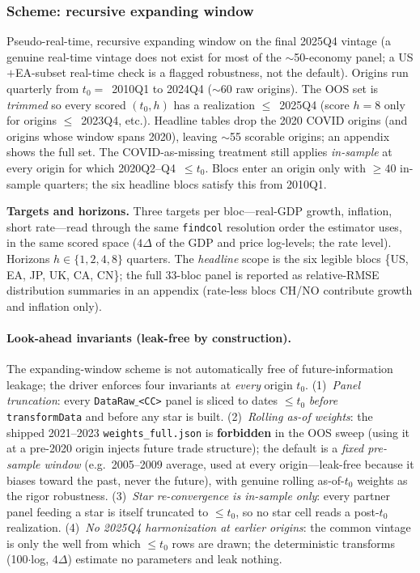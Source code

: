 \documentclass[11pt]{article}
\theoremstyle{definition}
\theoremstyle{remark}
\begin{document}
\subsubsection{Scheme: recursive expanding window}\label{sec:empirical:scheme}

Pseudo-real-time, recursive expanding window on the final 2025Q4 vintage
(a genuine real-time vintage does not exist for most of the $\sim$50-economy
panel; a US$+$EA-subset real-time check is a flagged robustness, not the
default). Origins run quarterly from $t_0=$~2010Q1 to 2024Q4
($\sim$60 raw origins). The OOS set is \emph{trimmed} so every scored
$(t_0,h)$ has a realization $\le$~2025Q4 (score $h{=}8$ only for origins
$\le$~2023Q4, etc.). Headline tables drop the 2020 COVID origins (and
origins whose window spans 2020), leaving $\sim$55 scorable origins;
an appendix shows the full set. The COVID-as-missing treatment still
applies \emph{in-sample} at every origin for which 2020Q2--Q4~$\le t_0$.
Blocs enter an origin only with $\ge40$ in-sample quarters; the six
headline blocs satisfy this from 2010Q1.

\textbf{Targets and horizons.} Three targets per bloc---real-GDP growth,
inflation, short rate---read through the same \texttt{findcol} resolution
order the estimator uses, in the same scored space ($4\Delta$ of the GDP
and price log-levels; the rate level). Horizons $h\in\{1,2,4,8\}$
quarters. The \emph{headline} scope is the six legible blocs
\{US, EA, JP, UK, CA, CN\}; the full 33-bloc panel is reported as
relative-RMSE distribution summaries in an appendix (rate-less blocs
CH/NO contribute growth and inflation only).

\paragraph{Look-ahead invariants (leak-free by construction).} The
expanding-window scheme is not automatically free of future-information
leakage; the driver enforces four invariants at \emph{every} origin
$t_0$. (1)~\emph{Panel truncation}: every \texttt{DataRaw}$\_$\texttt{<CC>}
panel is sliced to dates $\le t_0$ \emph{before} \texttt{transformData}
and before any star is built. (2)~\emph{Rolling as-of weights}: the
shipped 2021--2023 \texttt{weights\_full.json} is \textbf{forbidden} in
the OOS sweep (using it at a pre-2020 origin injects future trade
structure); the default is a \emph{fixed pre-sample window}
(e.g.\ 2005--2009 average, used at every origin---leak-free because it
biases toward the past, never the future), with genuine rolling
as-of-$t_0$ weights as the rigor robustness. (3)~\emph{Star re-convergence
is in-sample only}: every partner panel feeding a star is itself
truncated to $\le t_0$, so no star cell reads a post-$t_0$ realization.
(4)~\emph{No 2025Q4 harmonization at earlier origins}: the common vintage
is only the well from which $\le t_0$ rows are drawn; the deterministic
transforms (100$\cdot$log, $4\Delta$) estimate no parameters and leak
nothing.
\end{document}
